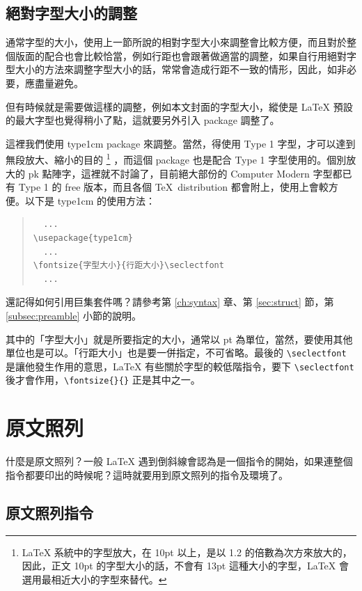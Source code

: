\subsection{絕對字型大小的調整}

通常字型的大小，使用上一節所說的相對字型大小來調整會比較方便，而且對於整個版面的配合也會比較恰當，例如行距也會跟著做適當的調整，如果自行用絕對字型大小的方法來調整字型大小的話，常常會造成行距不一致的情形，因此，如非必要，應盡量避免。

但有時候就是需要做這樣的調整，例如本文封面的字型大小，縱使是 \LaTeX{} 預設的最大字型也覺得稍小了點，這就要另外引入 package 調整了。

這裡我們使用 \textsf{type1cm} package 來調整。當然，得使用 Type 1 字型，才可以達到無段放大、縮小的目的%
\footnote{\LaTeX{} 系統中的字型放大，在 10pt 以上，是以 1.2 的倍數為次方來放大的，因此，正文 10pt 的字型大小的話，不會有 13pt 這種大小的字型，\LaTeX{} 會選用最相近大小的字型來替代。}%
，而這個 package 也是配合 Type 1 字型使用的。個別放大的 pk 點陣字，這裡就不討論了，目前絕大部份的 Computer Modern 字型都已有 Type 1 的 free 版本，而且各個 \TeX\ distribution 都會附上，使用上會較方便。以下是 \textsf{type1cm} 的使用方法：

\begin{quote}
   \begin{verbatim}
  ...
\usepackage{type1cm}
  ...
\fontsize{字型大小}{行距大小}\seclectfont
  ...
\end{verbatim}
\end{quote}

還記得如何引用巨集套件嗎？請參考第 \ref{ch:syntax} 章、第 \ref{sec:struct} 節，第 \ref{subsec:preamble} 小節的說明。

其中的「字型大小」就是所要指定的大小，通常以 pt 為單位，當然，要使用其他單位也是可以。「行距大小」也是要一併指定，不可省略。最後的 \verb|\seclectfont| 是讓他發生作用的意思，\LaTeX{} 有些關於字型的較低階指令，要下 \verb|\seclectfont| 後才會作用，\verb|\fontsize{}{}| 正是其中之一。

\section{原文照列}

什麼是原文照列？一般 \LaTeX{} 遇到倒斜線會認為是一個指令的開始，如果連整個指令都要印出的時候呢？這時就要用到原文照列的指令及環境了。

\subsection{原文照列指令}

